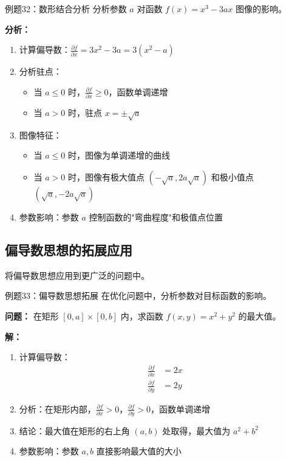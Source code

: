 \documentclass[a4paper,11pt]{ctexart}
\newcommand{\partialder}[2]{\frac{\partial #1}{\partial #2}}
\theoremstyle{definition}
\theoremstyle{remark}
\begin{document}
\begin{examplebox}{例题32：数形结合分析}
分析参数 $a$ 对函数 $f(x) = x^3 - 3ax$ 图像的影响。

\textbf{分析：}
\begin{enumerate}
    \item 计算偏导数：$\partialder{f}{x} = 3x^2 - 3a = 3(x^2 - a)$
    \item 分析驻点：
    \begin{itemize}
        \item 当 $a \leq 0$ 时，$\partialder{f}{x} \geq 0$，函数单调递增
        \item 当 $a > 0$ 时，驻点 $x = \pm\sqrt{a}$
    \end{itemize}
    \item 图像特征：
    \begin{itemize}
        \item 当 $a \leq 0$ 时，图像为单调递增的曲线
        \item 当 $a > 0$ 时，图像有极大值点 $(-\sqrt{a}, 2a\sqrt{a})$ 和极小值点 $(\sqrt{a}, -2a\sqrt{a})$
    \end{itemize}
    \item 参数影响：参数 $a$ 控制函数的"弯曲程度"和极值点位置
\end{enumerate}
\end{examplebox}

\subsection{偏导数思想的拓展应用}

将偏导数思想应用到更广泛的问题中。

\begin{examplebox}{例题33：偏导数思想拓展}
在优化问题中，分析参数对目标函数的影响。

\textbf{问题：} 在矩形 $[0,a] \times [0,b]$ 内，求函数 $f(x,y) = x^2 + y^2$ 的最大值。

\textbf{解：}
\begin{enumerate}
    \item 计算偏导数：
    \begin{align}
    \partialder{f}{x} &= 2x \\
    \partialder{f}{y} &= 2y
    \end{align}
    \item 分析：在矩形内部，$\partialder{f}{x} > 0$，$\partialder{f}{y} > 0$，函数单调递增
    \item 结论：最大值在矩形的右上角 $(a,b)$ 处取得，最大值为 $a^2 + b^2$
    \item 参数影响：参数 $a, b$ 直接影响最大值的大小
\end{enumerate}
\end{examplebox}
\end{document}
